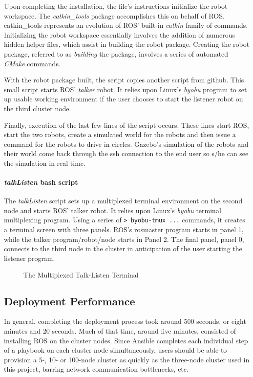 \documentclass[9pt,twocolumn,twoside]{../../styles/osajnl}
\begin{document}
Upon completing the installation, the file's instructions initialize the robot workspace.  The \textit{catkin\_tools} package accomplishes this on behalf of ROS.  catkin\_tools represents an evolution of ROS' built-in \textit{catkin} family of commands.  Initializing the robot workspace essentially involves the addition of numerous hidden helper files, which assist in building the robot package.  Creating the robot package, referred to as \textit{building} the package, involves a series of automated \textit{CMake} commands.  

With the robot package built, the script copies another script from github.  This small script starts ROS' \textit{talker} robot.  It relies upon Linux's \textit{byobu} program to set up usable working environment if the user chooses to start the listener robot on the third cluster node.

Finally, execution of the last few lines of the script occurs.  These lines start ROS, start the two robots, create a simulated world for the robots and then issue a command for the robots to drive in circles.  Gazebo's simulation of the robots and their world come back through the ssh connection to the end user so s/he can see the simulation in real time. 

\paragraph{\textit{talkListen} bash script}
The \textit{talkListen} script sets up a multiplexed terminal environment on the second node and starts ROS' talker robot.  It relies upon Linux's \textit{byobu} terminal multiplexing program.  Using a series of {\color{green} \lstinline[style=BashInputStyle]!> byobu-tmux ...! } commands, it creates a terminal screen with three panels.  ROS's rosmaster program starts in panel 1, while the talker program/robot/node starts in Panel 2.  The final panel, panel 0, connects to the third node in the cluster in anticipation of the user starting the listener program.

\begin{figure*}[htbp]
\centering
{}
\caption{The Multiplexed Talk-Listen Terminal}
\label{fig:byobu}
\end{figure*}

\subsection{Deployment Performance}
In general, completing the deployment process took around 500 seconds, or eight minutes and 20 seconds.  Much of that time, around five minutes, consisted of installing ROS on the cluster nodes.  Since Ansible completes each individual step of a playbook on each cluster node simultaneously, users should be able to provision a 5-, 10- or 100-node cluster as quickly as the three-node cluster used in this project, barring network communication bottlenecks, etc. 
\end{document}
